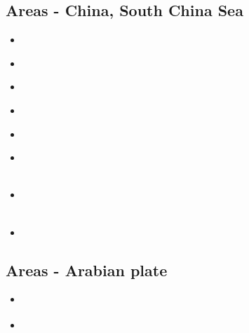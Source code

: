 \subsection{Areas - China, South China Sea}

\begin{scriptsize}
\begin{itemize}
\item[\twothousandten] 
\textcite{zhst10} \\
\item[\twothousandfifteen] 
\textcite{wazh15} \\
\item[\twothousandsixteen] 
\textcite{guyr16} \\
\item[\twothousandeighteen] 
\textcite{lecd18} \\
\item[\twothousandnineteen] 
\textcite{lixs19} \\
\item[\twothousandtwenty] 
\textcite{dawl20} \\
\textcite{lisy20} \\
\item[\twothousandtwentyone] 
\textcite{qill21} \\
\textcite{yalz21} \\
\item[\twothousandtwentytwo] 
\textcite{lilg22} \\
\end{itemize}
\end{scriptsize}

\subsection{Areas - Arabian plate}

\begin{scriptsize}
\begin{itemize}
\item[\twothousandthirteen] \textcite{fabj13}
\item[\twothousandfifteen] \textcite{rerl15}
\end{itemize}
\end{scriptsize}

